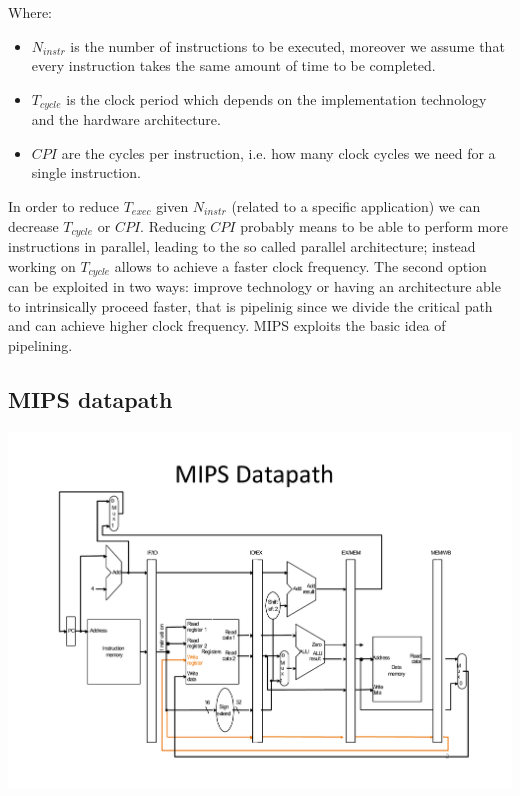 Where:
\begin{itemize}
  \item $N_{instr}$ is the number of instructions to be executed, moreover we assume that every instruction takes the same amount of time to be completed.
  \item $T_{cycle}$ is the clock period which depends on the implementation technology and the hardware architecture.
  \item $CPI$ are the cycles per instruction, i.e. how many clock cycles we need for a single instruction.

\end{itemize}

In order to reduce $T_{exec}$ given $N_{instr}$ (related to a specific application) we can decrease $T_{cycle}$ or $CPI$. Reducing $CPI$ probably means to be able to perform more instructions in parallel, leading to the so called parallel architecture; instead working on $T_{cycle}$ allows to achieve a faster clock frequency. The second option can be exploited in two ways: improve technology or having an architecture able to intrinsically proceed faster, that is pipelinig since we divide the critical path and can achieve higher clock frequency. MIPS exploits the basic idea of pipelining.

\subsection{MIPS datapath}
\begin{center}
  \includegraphics[width=1.1\linewidth]{img/img3/mips1}
\end{center}

